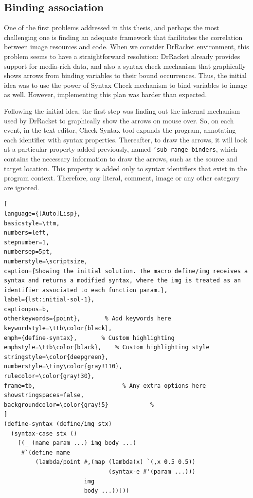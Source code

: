 \subsection{Binding association}

One of the first problems addressed in this thesis, and perhaps the most challenging one is finding an adequate framework that facilitates the correlation between image resources and code. When we consider DrRacket environment, this problem seems to have a straightforward resolution: DrRacket already provides support for media-rich data, and also a syntax check mechanism that graphically shows arrows from binding variables to their bound occurrences. Thus, the initial idea was to use the power of Syntax Check mechanism to bind variables to image as well. However, implementing this plan was harder than expected.

Following the initial idea, the first step was finding out the internal mechanism used by DrRacket to graphically show the arrows on mouse over. So, on each event, in the text editor, Check Syntax tool expands the program, annotating each identifier with syntax properties. Thereafter, to draw the arrows, it will look at a particular property added previously, named \texttt{'sub-range-binders}, which contains the necessary information to draw the arrows, such as the source and target location. This property is added only to syntax identifiers that exist in the program context. Therefore, any literal, comment, image or any other category are ignored.\\

\begin{lstlisting}[
language={[Auto]Lisp},
basicstyle=\ttm,
numbers=left,
stepnumber=1,
numbersep=5pt,                   
numberstyle=\scriptsize, 
caption={Showing the initial solution. The macro define/img receives a syntax and returns a modified syntax, where the img is treated as an identifier associated to each function param.},
label={lst:initial-sol-1},
captionpos=b, 
otherkeywords={point},       % Add keywords here
keywordstyle=\ttb\color{black},
emph={define-syntax},       % Custom highlighting
emphstyle=\ttb\color{black},    % Custom highlighting style
stringstyle=\color{deepgreen},
numberstyle=\tiny\color{gray!110},
rulecolor=\color{gray!30},
frame=tb,                         % Any extra options here
showstringspaces=false,
backgroundcolor=\color{gray!5}            % 
]
(define-syntax (define/img stx)
  (syntax-case stx ()
    [(_ (name param ...) img body ...)
     #`(define name 
         (lambda/point #,(map (lambda(x) `(,x 0.5 0.5)) 
                              (syntax-e #'(param ...)))
                       img
                       body ...))]))
\end{lstlisting}

